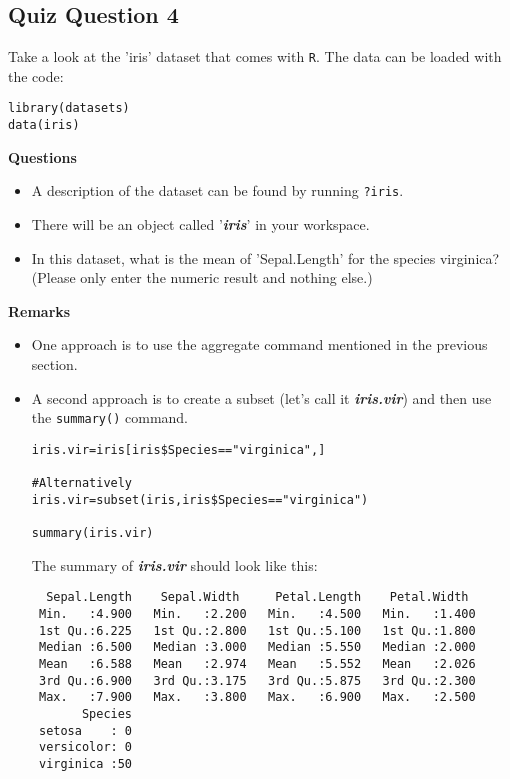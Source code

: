 \documentclass[12pt]{article}
\begin{document}
\subsection*{Quiz Question 4}
Take a look at the 'iris' dataset that comes with \texttt{R}. The data can be loaded with the code:
\begin{framed}
\begin{verbatim}
library(datasets)
data(iris)
\end{verbatim}
\end{framed}
\noindent \textbf{Questions}
\begin{itemize}
\item A description of the dataset can be found by running \texttt{?iris}.
\item 
There will be an object called '\textit{\textbf{iris}}' in your workspace. 
\item In this dataset, what is the mean of 'Sepal.Length' for the species virginica? (Please only enter the numeric result and nothing else.)
\end{itemize}
\textbf{Remarks}
\begin{itemize}
\item One approach is to use the aggregate command mentioned in the previous section.
\item A second approach is to create a subset (let's call it \textit{\textbf{iris.vir}}) and then use the \texttt{summary()} command.
\begin{framed}
\begin{verbatim}
iris.vir=iris[iris$Species=="virginica",]

#Alternatively
iris.vir=subset(iris,iris$Species=="virginica")

summary(iris.vir)
\end{verbatim}
\end{framed}
\newpage
The summary of \textit{\textbf{iris.vir}} should look like this:
\begin{verbatim}
  Sepal.Length    Sepal.Width     Petal.Length    Petal.Width   
 Min.   :4.900   Min.   :2.200   Min.   :4.500   Min.   :1.400  
 1st Qu.:6.225   1st Qu.:2.800   1st Qu.:5.100   1st Qu.:1.800  
 Median :6.500   Median :3.000   Median :5.550   Median :2.000  
 Mean   :6.588   Mean   :2.974   Mean   :5.552   Mean   :2.026  
 3rd Qu.:6.900   3rd Qu.:3.175   3rd Qu.:5.875   3rd Qu.:2.300  
 Max.   :7.900   Max.   :3.800   Max.   :6.900   Max.   :2.500  
       Species  
 setosa    : 0  
 versicolor: 0  
 virginica :50  

\end{verbatim}
\end{itemize}
\end{document}
